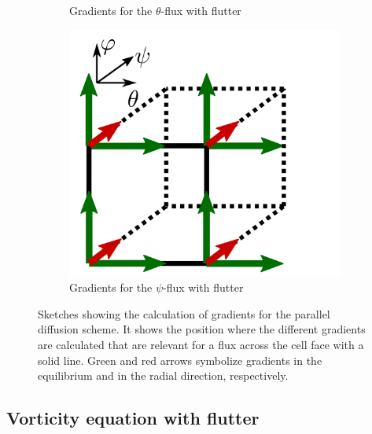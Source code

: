 \begin{figure}[H]
\begin{subfigure}[t]{0.32\textwidth}
		\caption{ Gradients for the $\theta$-flux with flutter}
		\label{fig:Gunter3D_theta} 
	\end{subfigure}
	\begin{subfigure}[t]{0.32\textwidth}
		\centering
		\includegraphics[width=\textwidth]{schemes/Gunter3D_psi.png}
		\caption{ Gradients for the $\psi$-flux with flutter}
		\label{fig:GunterD_psi}
	\end{subfigure}
	\caption{Sketches showing the calculation of gradients for the parallel diffusion scheme. It shows the position where the different gradients are calculated that are relevant for a flux across the cell face with a solid line. Green and red arrows symbolize gradients in the equilibrium and in the radial direction, respectively.}
	\label{fig:GunterStencils_flutter}
\end{figure}



\subsection{Vorticity equation with flutter}

